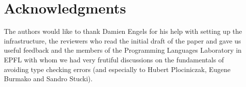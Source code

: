  \section{Acknowledgments}


The authors would like to thank Damien Engels for his help with setting up the infrastructure, the reviewers who read the initial draft of the paper and gave us useful feedback and the members of the Programming Languages Laboratory in EPFL with whom we had very frutiful discussions on the fundamentals of avoiding type checking errors (and especially to Hubert Plociniczak, Eugene Burmako and Sandro Stucki). \\